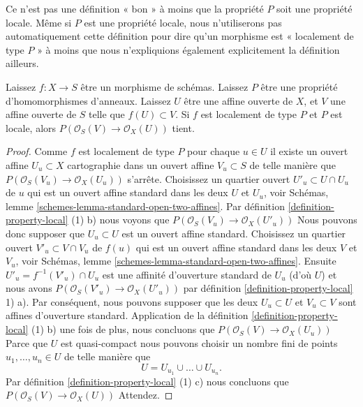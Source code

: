 \noindent
Ce n'est pas une définition « bon » à moins que la propriété $P$ soit une propriété locale. Même si $P$ est une propriété locale, nous n'utiliserons pas automatiquement cette définition pour dire qu'un morphisme est « localement de type $P$ » à moins que nous n'expliquions également explicitement la définition ailleurs.

\begin{lemma}

\label{lemma-locally-P}
Laissez $f : X \to S$ être un morphisme de schémas. Laissez $P$ être une propriété d'homomorphismes d'anneaux. Laissez $U$ être une affine ouverte de $X$, et $V$ une affine ouverte de $S$ telle que $f(U) \subset V$. Si $f$ est localement de type $P$ et $P$ est locale, alors $P(\mathcal{O}_S(V) \to \mathcal{O}_X(U))$ tient.
\end{lemma}

\begin{proof}

Comme $f$ est localement de type $P$ pour chaque $u \in U$ il existe un ouvert affine $U_u \subset X$ cartographie dans un ouvert affine $V_u \subset S$
de telle manière que $P(\mathcal{O}_S(V_u) \to \mathcal{O}_X(U_u))$ s'arrête. Choisissez un quartier ouvert $U'_u \subset U \cap U_u$ de $u$
qui est un ouvert affine standard dans les deux $U$ et $U_u$, voir Schémas, lemme \ref{schemes-lemma-standard-open-two-affines}. Par définition \ref{definition-property-local} (1) b) nous voyons que $P(\mathcal{O}_S(V_u) \to \mathcal{O}_X(U'_u))$ Nous pouvons donc supposer que $U_u \subset U$ est un ouvert affine standard. Choisissez un quartier ouvert $V'_u \subset V \cap V_u$
de $f(u)$ qui est un ouvert affine standard dans les deux $V$ et $V_u$, voir Schémas, lemme \ref{schemes-lemma-standard-open-two-affines}. Ensuite $U'_u = f^{-1}(V'_u) \cap U_u$ est une affinité d'ouverture standard de $U_u$ (d'où $U$) et nous avons
$P(\mathcal{O}_S(V'_u) \to \mathcal{O}_X(U'_u))$ par définition \ref{definition-property-local} 1) a). Par conséquent, nous pouvons supposer que les deux $U_u \subset U$ et $V_u \subset V$
sont affines d'ouverture standard. Application de la définition \ref{definition-property-local} (1) b) une fois de plus, nous concluons que $P(\mathcal{O}_S(V) \to \mathcal{O}_X(U_u))$
Parce que $U$ est quasi-compact nous pouvons choisir un nombre fini de points $u_1, \ldots, u_n \in U$ de telle manière que
$$
U = U_{u_1} \cup \ldots \cup U_{u_n}.
$$
Par définition \ref{definition-property-local} (1) c) nous concluons que $P(\mathcal{O}_S(V) \to \mathcal{O}_X(U))$ Attendez.

\end{proof}

